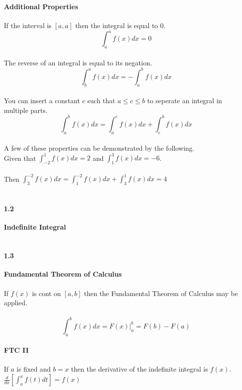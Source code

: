 \documentclass[14pt]{extreport}
\begin{document}
\textbf{Additional Properties}\\\\

If the interval is $[a,a]$ then the integral is equal to $0$.\\
$$\int_{a}^{a} f(x)dx = 0$$\\

The reverse of an integral is equal to its negation.\\
$$\int_{b}^{a} f(x)dx = -\int_{a}^{b} f(x)dx$$\\

You can insert a constant $c$ such that $a\leq c \leq b$ to seperate an integral in multiple parts.\\

$$\int_{a}^{b} f(x)dx = \int_{a}^{c} f(x)dx + \int_{c}^{b} f(x)dx$$\\

A few of these properties can be demonstrated by the following.\\

Given that $\int_{-2}^{1} f(x)dx = 2$ and $\int_{1}^{3} f(x)dx = -6$.\\\\

Then $\int_{3}^{-2} f(x)dx = \int_{1}^{-2} f(x)dx + \int_{3}^{1} f(x)dx = 4$\\\\

\paragraph{1.2} \textbf{Indefinite Integral}\\\\


\paragraph{1.3} \textbf{Fundamental Theorem of Calculus}\\\\

If $f(x)$ is cont on $[a,b]$ then the Fundamental Theorem of Calculus may be applied.\\\\
$$\int_{a}^{b} f(x)dx = F(x) |_{a}^{b} = F(b) - F(a) $$\\

\textbf{FTC II}\\\\
If $a$ is fixed and $b=x$ then the derivative of the indefinite integral is $f(x)$.\\
$\frac{d}{dx}[\int_{a}^{x} f(t)dt] = f(x)$\\\\
\end{document}
